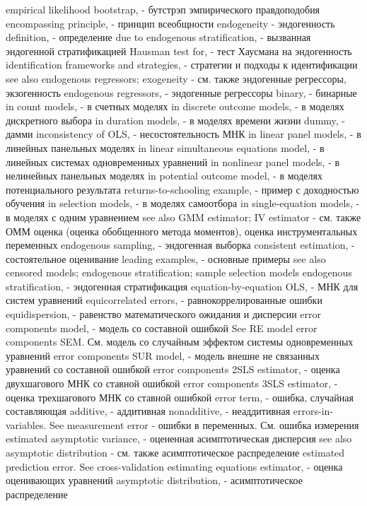 empirical likelihood bootstrap, - бутстрэп эмпирического правдоподобия
encompassing principle, - принцип всеобщности
endogeneity - эндогенность
definition, - определение
due to endogenous stratification, - вызванная эндогенной стратификацией
Hausman test for,  - тест Хаусмана на эндогенность
identification frameworks and strategies, - стратегии и подходы к идентификации
see also endogenous regressors; exogeneity - см. также эндогенные регрессоры, экзогенность
endogenous regressors, - эндогенные регрессоры
binary, - бинарные 
in count models, - в счетных моделях
in discrete outcome models, - в моделях дискретного выбора
in duration models, - в моделях времени жизни
dummy, - дамми
inconsistency of OLS, - несостоятельность МНК
in linear panel models, - в линейных панельных моделях
in linear simultaneous equations model, - в линейных системах одновременных уравнений
in nonlinear panel models, - в нелинейных панельных моделях
in potential outcome model, - в моделях потенциального результата
returns-to-schooling example, - пример с доходностью обучения
in selection models, - в моделях самоотбора
in single-equation models, - в моделях с одним уравнением
see also GMM estimator; IV estimator - см. также ОММ оценка (оценка обобщенного метода моментов), оценка инструментальных переменных
endogenous sampling, - эндогенная выборка
consistent estimation, - состоятельное оценивание
leading examples, - основные примеры
see also censored models; endogenous stratification; sample selection models 
endogenous stratification, - эндогенная стратификация
equation-by-equation OLS, - МНК для систем уравнений
equicorrelated errors, - равнокоррелированные ошибки
equidispersion, - равенство математического ожидания и дисперсии
error components model, - модель со составной ошибкой
See RE model error components SEM. См. модель со случайным эффектом системы одновременных уравнений
error components SUR model, - модель внешне не связанных уравнений со составной ошибкой
error components 2SLS estimator, - оценка двухшагового МНК со ставной ошибкой    
error components 3SLS estimator, - оценка трехшагового МНК со ставной ошибкой    
error term, - ошибка, случайная составляющая
additive, - аддитивная
nonadditive, - неаддитивная
errors-in-variables. See measurement error - ошибки в переменных. См. ошибка измерения
estimated asymptotic variance, - оцененная асимптотическая дисперсия
see also asymptotic distribution - см. также асимптотическое распределение
estimated prediction error. See cross-validation 
estimating equations estimator, - оценка оценивающих уравнений
asymptotic distribution, - асимптотическое распределение
